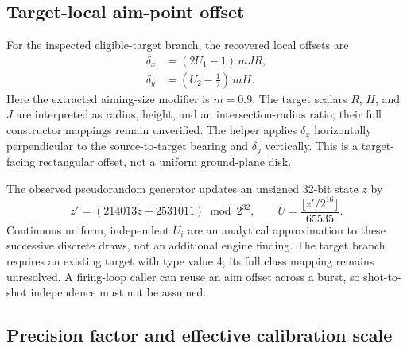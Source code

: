 \documentclass[11pt]{article}
\begin{document}
\subsection{Target-local aim-point offset}

For the inspected eligible-target branch, the recovered local offsets are
\begin{align}
  \delta_x &= (2U_1-1)\,mJR,\\
  \delta_y &= (U_2-\tfrac12)\,mH.
  \label{eq:target-aim-offset}
\end{align}
Here the extracted aiming-size modifier is $m=0.9$.  The target scalars
$R$, $H$, and $J$ are interpreted as radius, height, and an intersection-radius
ratio; their full constructor mappings remain unverified.  The helper applies
$\delta_x$ horizontally perpendicular to the source-to-target bearing and
$\delta_y$ vertically.  This is a target-facing rectangular offset, not a
uniform ground-plane disk.

The observed pseudorandom generator updates an unsigned 32-bit state $z$ by
\begin{equation}
  z'=(214013z+2531011)\bmod 2^{32},
  \qquad U=\frac{\lfloor z'/2^{16}\rfloor}{65535}.
\end{equation}
Continuous uniform, independent $U_i$ are an analytical approximation to
these successive discrete draws, not an additional engine finding.
The target branch requires an existing target with type value 4; its full
class mapping remains unresolved.  A firing-loop caller can reuse an aim
offset across a burst, so shot-to-shot independence must not be assumed.

\subsection{Precision factor and effective calibration scale}
\end{document}
